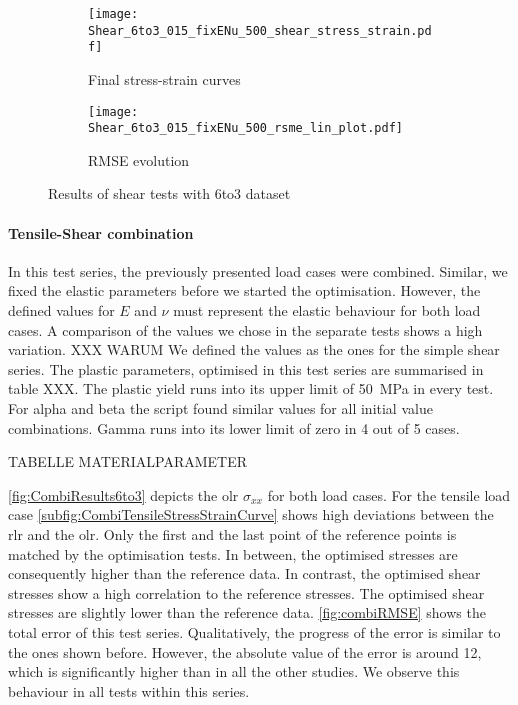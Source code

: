 \begin{figure}[H]
\centering
\begin{subfigure}[t]{0.495\textwidth}
    \centering
     \texttt{[image: Shear\_6to3\_015\_fixENu\_500\_shear\_stress\_strain.pdf]}
        \caption{Final stress-strain curves}
        \label{subfig:shearStressStrain6to3}
\end{subfigure}
\hfill
\begin{subfigure}[t]{0.495\textwidth}
    \centering
    \texttt{[image: Shear\_6to3\_015\_fixENu\_500\_rsme\_lin\_plot.pdf]}
        \caption{ RMSE evolution}
        \label{subfig:shearRMSE}
\end{subfigure}
\caption{Results of shear tests with 6to3 dataset}
\label{fig:shearResults6to3}
\end{figure}

\paragraph{Tensile-Shear combination}

In this test series, the previously presented load cases were combined. Similar, we fixed the elastic parameters before we started the optimisation. However, the defined values for $E$ and $\nu$ must represent the elastic behaviour for both load cases. A comparison of the values we chose in the separate tests shows a high variation. XXX WARUM 
We defined the values as the ones for the simple shear series. The plastic parameters, optimised in this test series are summarised in table XXX. The plastic yield runs into its upper limit of 50 MPa in every test. For alpha and beta the script found similar values for all initial value combinations. Gamma runs into its lower limit of zero in 4 out of 5 cases. 

TABELLE MATERIALPARAMETER

\autoref{fig:CombiResults6to3} depicts the \acrlong{olr} $\sigma_{xx}$ for both load cases. For the tensile load case \autoref{subfig:CombiTensileStressStrainCurve} shows high deviations between the \acrlong{rlr} and the \acrlong{olr}. Only the first and the last point of the reference points is matched by the optimisation tests. In between, the optimised stresses are consequently higher than the reference data. In contrast, the optimised shear stresses show a high correlation to the reference stresses. The optimised shear stresses are slightly lower than the reference data. \autoref{fig:combiRMSE} shows the total error of this test series. Qualitatively, the progress of the error is similar to the ones shown before. However, the absolute value of the error is around 12, which is significantly higher than in all the other studies. We observe this behaviour in all tests within this series. 


